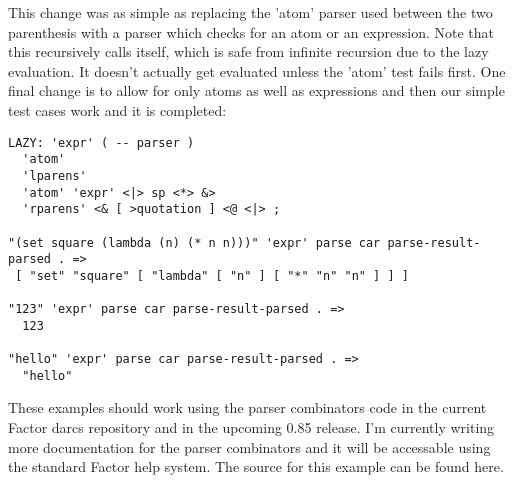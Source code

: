 This change was as simple as replacing the 'atom' parser used between
the two parenthesis with a parser which checks for an atom or an
expression. Note that this recursively calls itself, which is safe
from infinite recursion due to the lazy evaluation. It doesn't
actually get evaluated unless the 'atom' test fails first. One final
change is to allow for only atoms as well as expressions and then our
simple test cases work and it is completed:

\begin{verbatim}
LAZY: 'expr' ( -- parser )
  'atom'   
  'lparens' 
  'atom' 'expr' <|> sp <*> &>
  'rparens' <& [ >quotation ] <@ <|> ;

"(set square (lambda (n) (* n n)))" 'expr' parse car parse-result-parsed . =>
 [ "set" "square" [ "lambda" [ "n" ] [ "*" "n" "n" ] ] ]

"123" 'expr' parse car parse-result-parsed . => 
  123

"hello" 'expr' parse car parse-result-parsed . => 
  "hello"
\end{verbatim}

These examples should work using the parser combinators code in the
current Factor darcs repository and in the upcoming 0.85 release. I'm
currently writing more documentation for the parser combinators and it
will be accessable using the standard Factor help system. The source
for this example can be found here.
